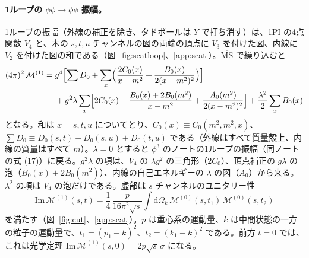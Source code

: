 \documentclass[a4paper,10pt]{ltjsarticle}
\newcommand{\dd}{\mathrm{d}}
\begin{document}
\paragraph{1ループの $\phi\phi\to\phi\phi$ 振幅。}1ループの振幅（外線の補正を除き、タドポールは $Y$ で打ち消す）は、1PI の4点関数 $V_4$ と、木の $s,t,u$ チャンネルの図の両端の頂点に $V_3$ を付けた図、内線に $V_2$ を付けた図の和である（図~\ref{fig:scatloop}、\ref{app:scat}）。$\overline{\mathrm{MS}}$ で繰り込むと
\begin{equation}
\begin{aligned}
(4\pi)^2\,\mathcal{M}^{(1)}={}&g^4\Bigl[\sum D_0+\sum_x\Bigl(\frac{2C_0(x)}{x-m^2}+\frac{B_0(x)}{2(x-m^2)^2}\Bigr)\Bigr]\\
&+g^2\lambda\sum_x\Bigl[2C_0(x)+\frac{B_0(x)+2B_0(m^2)}{x-m^2}+\frac{A_0(m^2)}{2(x-m^2)^2}\Bigr]+\frac{\lambda^2}{2}\sum_xB_0(x)
\end{aligned}
\label{eq:M1}
\end{equation}
となる。和は $x=s,t,u$ についてとり、$C_0(x)\equiv C_0(m^2,m^2,x)$、$\sum D_0\equiv D_0(s,t)+D_0(s,u)+D_0(t,u)$ である（外線はすべて質量殻上、内線の質量はすべて $m$）。$\lambda=0$ とすると $\phi^3$ のノートの1ループの振幅（同ノートの式 (17)）に戻る。$g^2\lambda$ の項は、$V_4$ の $\lambda g^2$ の三角形（$2C_0$）、頂点補正の $g\lambda$ の泡（$B_0(x)+2B_0(m^2)$）、内線の自己エネルギーの $\lambda$ の図（$A_0$）から来る。$\lambda^2$ の項は $V_4$ の泡だけである。虚部は $s$ チャンネルのユニタリー性
\begin{equation}
\mathrm{Im}\,\mathcal{M}^{(1)}(s,t)=\frac14\,\frac{p}{16\pi^2\sqrt s}\int\!\dd\Omega_k\,\mathcal{M}^{(0)}(s,t_1)\,\mathcal{M}^{(0)}(s,t_2)
\label{eq:unit}
\end{equation}
を満たす（図~\ref{fig:cut}、\ref{app:scat}）。$p$ は重心系の運動量、$k$ は中間状態の一方の粒子の運動量で、$t_1=(p_1-k)^2$、$t_2=(k_1-k)^2$ である。前方 $t=0$ では、これは光学定理 $\mathrm{Im}\,\mathcal{M}^{(1)}(s,0)=2p\sqrt s\,\sigma$ になる。
\end{document}
